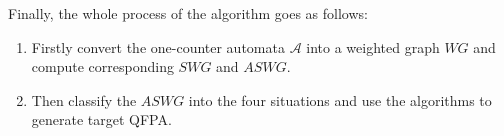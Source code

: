 \documentclass{article}
\begin{document}
Finally, the whole process of the algorithm goes as follows:
\begin{enumerate}



\item Firstly convert the one-counter automata $\mathcal{A}$ into a weighted graph $WG$ and compute corresponding $SWG$ and $ASWG$. 

\item Then classify the $ASWG$ into the four situations and use the algorithms to generate target QFPA.
\end{enumerate}
\end{document}
